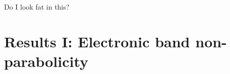 \begin{savequote}[8cm]
Do I look fat in this?
\end{savequote}

\chapter{\label{ch:4-effmass}Results I: Electronic band non-parabolicity}